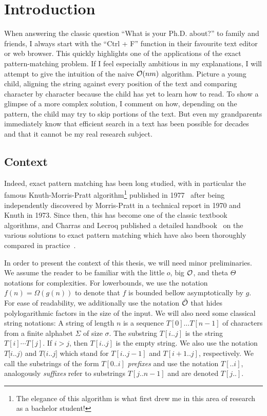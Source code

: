 \chapter*{Introduction}\label{chap:intro}\setcounter{page}{1}\frontmatter
{}

When answering the classic question ``What is your Ph.D. about?'' to family and friends, I always start with the ``Ctrl + F'' function in their favourite text editor or web browser. This quickly highlights one of the applications of the exact pattern-matching problem. If I feel especially ambitious in my explanations, I will attempt to give the intuition of the naive $\mathcal{O}(nm)$ algorithm. Picture a young child, aligning the string against every position of the text and comparing character by character because the child has yet to learn how to read. To show a glimpse of a more complex solution, I comment on how, depending on the pattern, the child may try to skip portions of the text. But even my grandparents immediately know that efficient search in a text has been possible for decades and that it cannot be my real research subject.

\section{Context}

Indeed, exact pattern matching has been long studied, with in particular the famous Knuth-Morris-Pratt algorithm\footnote{The elegance of this algorithm is what first drew me in this area of research as a bachelor student!} published in 1977~\cite{KMP} after being independently discovered by Morris-Pratt in a technical report in 1970 and Knuth in 1973. Since then, this has become one of the classic textbook algorithms, and Charras and Lecroq published a detailed handbook~\cite{charras2004handbook} on the various solutions to exact pattern matching which have also been thoroughly compared in practice~\cite{DBLP:journals/corr/abs-1012-2547, faro2013exact}.


In order to present the context of this thesis, we will need minor preliminaries. We assume the reader to be familiar with the little $o$, big $\mathcal{O}$, and theta $\Theta$ notations for complexities. For lowerbounds, we use the notation $f(n)=\Omega(g(n))$ to denote that $f$ is bounded bellow asymptotically by $g$. For ease of readability, we additionally use the notation $\tilde{\mathcal{O}}$ that hides polylogarithmic factors in the size of the input. 
We will also need some classical string notations: A string of length $n$ is a sequence $T[0] \dots T[n-1]$ of characters from a finite alphabet $\Sigma$ of size $\sigma$. The substring $T[i..j]$ is the string $T[i] \cdots T[j]$.
If $i > j$, then $T[i..j]$ is the empty string. We also use the notation $T[i..j)$ and $T(i..j]$ which stand for $T[i..j-1]$ and $T[i+1..j]$, respectively. We call the substrings of the form $T[0..i]$ \emph{prefixes}  and use the notation $T[..i]$, analogously \emph{suffixes} refer to substrings $T[j..n-1]$ and are denoted $T[j..]$.

